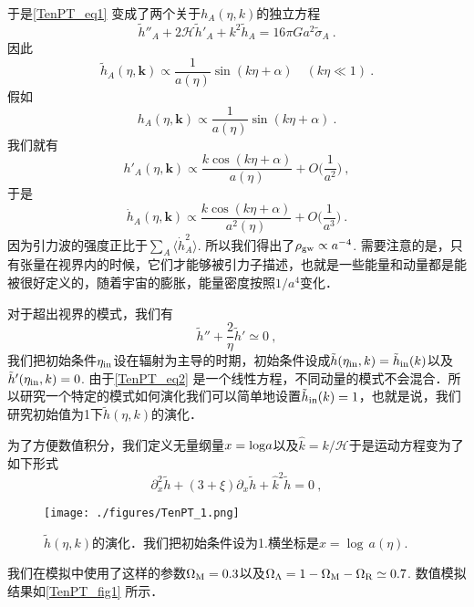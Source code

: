 于是\autoref{TenPT_eq1} 变成了两个关于$h_A(\eta,k)$的独立方程
\begin{equation}\label{TenPT_eq2}
\tilde h''_A + 2 \mathcal H \tilde h'_A + k^2\tilde h_A = 16 \pi G a^2 \tilde \sigma_A ~.
\end{equation}
因此
\begin{equation}
\tilde h_A(\eta,\mathbf k) \propto \frac{1}{a(\eta)} \sin(k\eta+\alpha)  \quad (k\eta \ll 1) ~.
\end{equation}
假如
\begin{equation}
h_A(\eta,\mathbf k) \propto \frac{1}{a(\eta)} \sin(k\eta+\alpha)   ~.
\end{equation}
我们就有
\begin{equation}
h'_A(\eta,\mathbf k) \propto \frac{k \cos(k\eta+\alpha)}{a(\eta)} + O \bigg( \frac{1}{a^2} \bigg) ~,
\end{equation}
于是
\begin{equation}
\dot h_A (\eta,\mathbf k) \propto \frac{k\cos(k\eta+\alpha)}{a^2 (\eta)} + O \bigg( \frac{1}{a^3} \bigg)~.
\end{equation}
因为引力波的强度正比于$\sum_A\langle \dot h_A^2 \rangle$. 所以我们得出了$\rho_{\rm gw} \propto a^{-4}$. 需要注意的是，只有张量在视界内的时候，它们才能够被引力子描述，也就是一些能量和动量都是能被很好定义的，随着宇宙的膨胀，能量密度按照$1/a^4$变化．

对于超出视界的模式，我们有
\begin{equation}
\tilde h'' + \frac{2}{\eta} \tilde h' \simeq 0 ~,
\end{equation}
我们把初始条件$\eta_{\rm in}$设在辐射为主导的时期，初始条件设成$\tilde h(\eta_{\rm in},k) = \tilde h_{\rm in} (k)$以及$\tilde h'(\eta_{\rm in},k) = 0$. 由于\autoref{TenPT_eq2} 是一个线性方程，不同动量的模式不会混合．所以研究一个特定的模式如何演化我们可以简单地设置$\tilde h_{\rm in}(k) = 1$，也就是说，我们研究初始值为1下$\tilde h({\eta,k})$的演化．

为了方便数值积分，我们定义无量纲量$x = {\rm log} a$以及$\hat k = k/\mathcal H$于是运动方程变为了如下形式
\begin{equation}
\partial^2_x \tilde h + (3+\xi) \partial_x \tilde h + \hat k^2 \tilde h = 0 ~,
\end{equation}
\begin{figure}[ht]
\centering
\texttt{[image: ./figures/TenPT\_1.png]}
\caption{$\tilde h(\eta,k)$的演化．我们把初始条件设为1.横坐标是$x = {\log} \, a (\eta).$} \label{TenPT_fig1}
\end{figure}
我们在模拟中使用了这样的参数$\Omega_{\rm M}=0.3$以及$\Omega_{\Lambda} = 1 - \Omega_{\rm M} - \Omega_{\rm R} \simeq 0.7$. 数值模拟结果如\autoref{TenPT_fig1} 所示．

